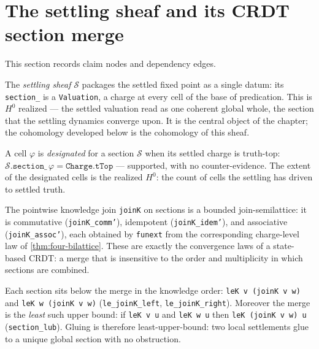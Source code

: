 \section{The settling sheaf and its CRDT section merge}

This section records claim nodes and dependency edges.

\begin{proposition}\label{thm:settling-sheaf}\leanok{}
The \emph{settling sheaf} $\mathcal{S}$ packages the settled fixed point as a single datum: its \texttt{section\_} is a \texttt{Valuation}, a charge at every cell of the base of predication. This is $H^0$ realized --- the settled valuation read as one coherent global whole, the section that the settling dynamics converge upon. It is the central object of the chapter; the cohomology developed below is the cohomology of this sheaf.
\end{proposition}
\begin{proposition}\label{thm:sheaf-designated}\leanok{}
A cell $\varphi$ is \emph{designated} for a section $\mathcal{S}$ when its settled charge is truth-top: $\mathcal{S}.\texttt{section\_}\,\varphi = \texttt{Charge.tTop}$ --- supported, with no counter-evidence. The extent of the designated cells is the realized $H^0$: the count of cells the settling has driven to settled truth.
\end{proposition}
\begin{theorem}\label{thm:section-merge-crdt}\leanok{}
The pointwise knowledge join \texttt{joinK} on sections is a bounded join-semilattice: it is commutative (\texttt{joinK\_comm'}), idempotent (\texttt{joinK\_idem'}), and associative (\texttt{joinK\_assoc'}), each obtained by \texttt{funext} from the corresponding charge-level law of \cref{thm:four-bilattice}. These are exactly the convergence laws of a state-based CRDT: a merge that is insensitive to the order and multiplicity in which sections are combined.
\end{theorem}
\begin{lemma}\label{thm:section-lub}\leanok{}
Each section sits below the merge in the knowledge order: \texttt{leK v (joinK v w)} and \texttt{leK w (joinK v w)} (\texttt{le\_joinK\_left}, \texttt{le\_joinK\_right}). Moreover the merge is the \emph{least} such upper bound: if \texttt{leK v u} and \texttt{leK w u} then \texttt{leK (joinK v w) u} (\texttt{section\_lub}). Gluing is therefore least-upper-bound: two local settlements glue to a unique global section with no obstruction.
\end{lemma}
